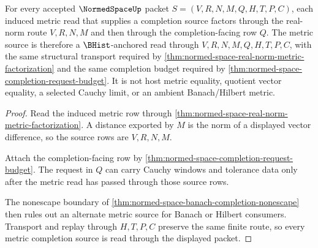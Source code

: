 \begin{theorem}
\label{thm:normedspace-metric-completion-source}
For every accepted $\NormedSpaceUp$ packet $S=(V,R,N,M,Q,H,T,P,C)$, each induced metric read that supplies a completion source factors through the real-norm route $V,R,N,M$ and then through the completion-facing row $Q$. The metric source is therefore a $\BHist$-anchored read through $V,R,N,M,Q,H,T,P,C$, with the same structural transport required by \autoref{thm:normed-space-real-norm-metric-factorization} and the same completion budget required by \autoref{thm:normed-space-completion-request-budget}. It is not host metric equality, quotient vector equality, a selected Cauchy limit, or an ambient Banach/Hilbert metric.
\end{theorem}
\begin{proof}
Read the induced metric row through \autoref{thm:normed-space-real-norm-metric-factorization}. A distance exported by $M$ is the norm of a displayed vector difference, so the source rows are $V,R,N,M$.

Attach the completion-facing row by \autoref{thm:normed-space-completion-request-budget}. The request in $Q$ can carry Cauchy windows and tolerance data only after the metric read has passed through those source rows.

The nonescape boundary of \autoref{thm:normed-space-banach-completion-nonescape} then rules out an alternate metric source for Banach or Hilbert consumers. Transport and replay through $H,T,P,C$ preserve the same finite route, so every metric completion source is read through the displayed packet.
\end{proof}

